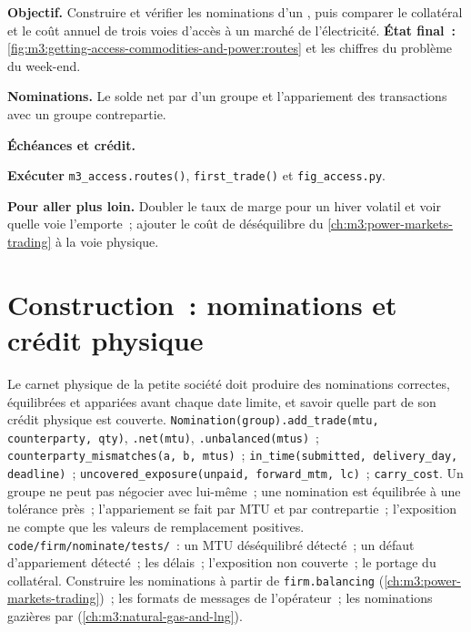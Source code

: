 \begin{tutorial}
\textbf{Objectif.} Construire et vérifier les nominations d'un , puis comparer le collatéral et le coût annuel de
trois voies d'accès à un marché de l'électricité. \textbf{État final~:}
\cref{fig:m3:getting-access-commodities-and-power:routes} et les chiffres du problème du week-end.
\begin{tutsteps}
\item \textbf{Nominations.} Le solde net par  d'un groupe et l'appariement des transactions avec un groupe contrepartie.
\label{lst:m3:getting-access-commodities-and-power:nomination}
\item \textbf{Échéances et crédit.}
\label{lst:m3:getting-access-commodities-and-power:credit}
\item \textbf{Exécuter} \texttt{m3\_access.routes()}, \texttt{first\_trade()} et \texttt{fig\_access.py}.
\end{tutsteps}
\textbf{Pour aller plus loin.} Doubler le taux de marge pour un hiver volatil et voir quelle voie l'emporte~; ajouter le
coût de déséquilibre du \cref{ch:m3:power-markets-trading} à la voie physique.
\end{tutorial}

\section{Construction~: nominations et crédit physique}\label{bld:m3:getting-access-commodities-and-power:nominate}

\begin{build}
 Le carnet physique de la petite société doit produire des nominations correctes, équilibrées et appariées
avant chaque date limite, et savoir quelle part de son crédit physique est couverte.
 \texttt{Nomination(group).add\_trade(mtu, counterparty, qty)}, \texttt{.net(mtu)},
\texttt{.unbalanced(mtus)}~; \texttt{counterparty\_mismatches(a, b, mtus)}~; \texttt{in\_time(submitted,
delivery\_day, deadline)}~; \texttt{uncovered\_exposure(unpaid, forward\_mtm, lc)}~; \texttt{carry\_cost}.
 Un groupe ne peut pas négocier avec lui-même~; une nomination est équilibrée à une tolérance près~;
l'appariement se fait par MTU et par contrepartie~; l'exposition ne compte que les valeurs de remplacement positives.
 \texttt{code/firm/nominate/tests/}~: un MTU déséquilibré détecté~; un défaut d'appariement détecté~;
les délais~; l'exposition non couverte~; le portage du collatéral.
 Construire les nominations à partir de \texttt{firm.balancing} (\cref{ch:m3:power-markets-trading})~;
les formats de messages de l'opérateur~; les nominations gazières par  (\cref{ch:m3:natural-gas-and-lng}).
\end{build}

